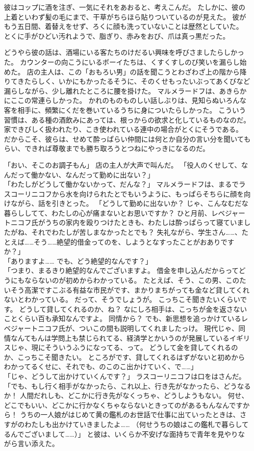 彼はコップに酒を注ぎ、一気にそれをあおると、考えこんだ。
たしかに、彼の上着といわず髪の毛にまで、干草がちらほら貼りついているのが見えた。
彼がもう五日間、着替えをせず、ろくに顔も洗っていないことは歴然としていた。
とくに手がひどい汚れようで、脂ぎり、赤みをおび、爪は真っ黒だった。

どうやら彼の話は、酒場にいる客たちのけだるい興味を呼びさましたらしかった。
カウンターの向こうにいるボーイたちは、くすくすしのび笑いを漏らし始めた。
店の主人は、この「おもろい男」の話を聞こうとわざわざ上の階から降りてきたらしく、いかにもかったるそうに、そのくせもったいぶってあくびなど漏らしながら、少し離れたところに腰を掛けた。
マルメラードフは、あきらかにここの常連らしかった。
かれのものものしい話しぶりは、見知らぬいろんな客を相手に、頻繁にくだを巻いているうちに身についたらしかった。
こういう習慣は、ある種の酒飲みにあっては、根っからの欲求と化しているものなのだ。
家できびしく扱われたり、こき使われている連中の場合がとくにそうである。
だからこそ、彼らは、せめて酔っぱらい仲間には何とか自分の言い分を聞いてもらい、できれば尊敬までも勝ち取ろうとつねにやっきになるのだ。

「おい、そこのお調子もん」
店の主人が大声で叫んだ。
「役人のくせして、なんだって働かない、なんだって勤めに出ない？」\\
「わたしがどうして働かないかって、だんな？」
マルメラードフは、まるでラスコーリニコフから水を向けられたとでもいうように、もっぱらそちらに顔を向けながら、話を引きとった。
「どうして勤めに出ないか？
じゃ、こんなむだな暮らししてて、わたしの心が痛まないとお思いですか？
ひと月前、レベジャートニコフ氏がうちの家内を殴りつけたときも、わたしは酔っぱらって寝ていましたがね、それでわたしが苦しまなかったとでも？
失礼ながら、学生さん……、たとえば……そう……絶望的借金ってのを、しようとなすったことがおありですか？」\\
「ありますよ……
でも、どう絶望的なんです？」\\
「つまり、まるきり絶望的なんでございますよ。
借金を申し込んだからってどうにもならないのが初めからわかっている。
たとえば、そう、この男、このたいそう高潔ですこぶる有益な市民がです、まかりまちがっても金など貸してくれないとわかっている。
だって、そうでしょうが。
こっちこそ聞きたいくらいです。
どうして貸してくれるのか、ね？
なにしろ相手は、こっちが金を返さないことくらい百も承知なんですよ。
同情から？
でも、新思想を追っかけているレベジャートニコフ氏が、ついこの間も説明してくれましたっけ。
現代じゃ、同情なんてもんは学問上も禁じられてる、経済学とかいうのが発展しているイギリスじゃ、現にそういうふうになってる、って。
どうして金を貸してくれるのか、こっちこそ聞きたい。
ところがです、貸してくれるはずがないと初めからわかってるくせに、それでも、のこのこ出かけていく、で……」
\\「じゃ、どうして出かけていくんです？」
ラスコーリニコフは口をはさんだ。
\\「でも、もし行く相手がなかったら、これ以上、行き先がなかったら、どうなるか！
人間だれしも、どこかに行き先がなくっちゃ、どうしようもない。
何せ、どこでもいい、どこかに行かなくちゃならないときってのがあるもんなんですから！
うちの一人娘がはじめて黄の鑑札のお世話で仕事に出ていったときは、さすがのわたしも出かけていきましたよ……
（何せうちの娘はこの鑑札で暮らしてるんでございまして……）」
と彼は、いくらか不安げな面持ちで青年を見やりながら言い添えた。